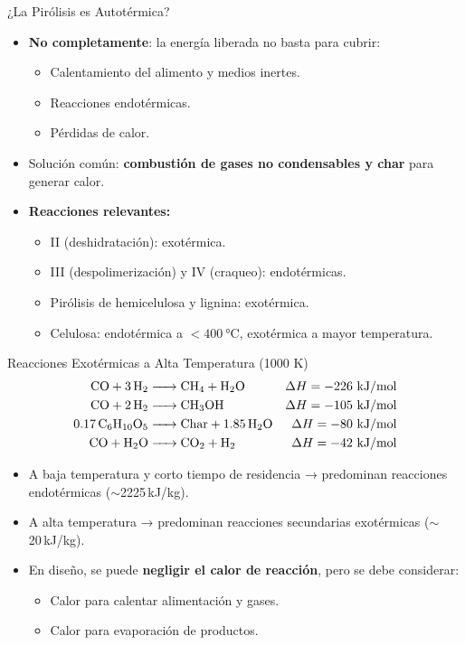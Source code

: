 \documentclass[../../main.tex]{subfiles}
\begin{document}
\begin{frame}{¿La Pirólisis es Autotérmica?}
\small
\begin{itemize}
  \item \textbf{No completamente}: la energía liberada no basta para cubrir:
  \begin{itemize}
    \item Calentamiento del alimento y medios inertes.
    \item Reacciones endotérmicas.
    \item Pérdidas de calor.
  \end{itemize}
  \item Solución común: \textbf{combustión de gases no condensables y char} para generar calor.
  \item \textbf{Reacciones relevantes:}
  \begin{itemize}
    \item II (deshidratación): exotérmica.
    \item III (despolimerización) y IV (craqueo): endotérmicas.
    \item Pirólisis de hemicelulosa y lignina: exotérmica.
    \item Celulosa: endotérmica a $<\SI{400}{\degreeCelsius}$, exotérmica a mayor temperatura.
  \end{itemize}
\end{itemize}
\end{frame}

\begin{frame}{Reacciones Exotérmicas a Alta Temperatura (1000 K)}
\small
\begin{align*}
\ce{CO + 3H2 &-> CH4 + H2O} & \Delta H = -226~\text{kJ/mol} \\
\ce{CO + 2H2 &-> CH3OH} & \Delta H = -105~\text{kJ/mol} \\
\ce{0.17C6H10O5 &-> Char + 1.85H2O} & \Delta H = -80~\text{kJ/mol} \\
\ce{CO + H2O &-> CO2 + H2} & \Delta H = -42~\text{kJ/mol}
\end{align*}

\vspace{0.3cm}
\begin{itemize}
  \item A baja temperatura y corto tiempo de residencia → predominan reacciones endotérmicas ($\sim$2225 kJ/kg).
  \item A alta temperatura → predominan reacciones secundarias exotérmicas ($\sim$20 kJ/kg).
  \item En diseño, se puede \textbf{negligir el calor de reacción}, pero se debe considerar:
  \begin{itemize}
    \item Calor para calentar alimentación y gases.
    \item Calor para evaporación de productos.
  \end{itemize}
\end{itemize}
\end{frame}
\end{document}
